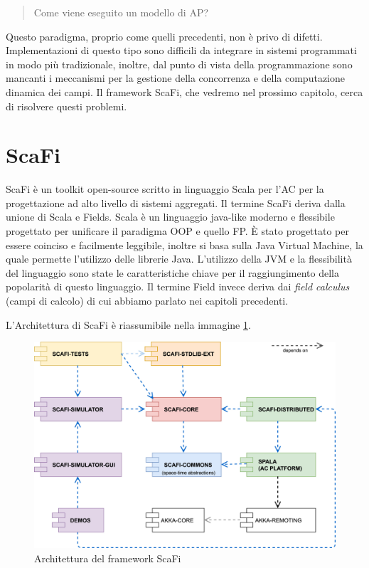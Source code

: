 \documentclass[12pt,a4paper,openright,twoside]{book}
\begin{document}
\begin{quote}
    \centering
    Come viene eseguito un modello di \ac{AP}?
\end{quote}

Questo paradigma, proprio come quelli precedenti, non è privo di difetti. 
Implementazioni di questo tipo sono difficili da integrare in sistemi programmati in modo più tradizionale, inoltre, dal punto di vista della programmazione sono mancanti i meccanismi per la gestione della concorrenza e della computazione dinamica dei campi. Il framework ScaFi, che vedremo nel prossimo capitolo, cerca di risolvere questi problemi.


\section{ScaFi}

ScaFi è un toolkit open-source scritto in linguaggio Scala per l'\ac{AC} per la progettazione ad alto livello di sistemi aggregati.
Il termine ScaFi deriva dalla unione di Scala e Fields. Scala è un linguaggio java-like moderno e flessibile progettato per unificare il paradigma \ac{OOP} e quello \ac{FP}. È stato progettato per essere coinciso e facilmente leggibile, inoltre si basa sulla Java Virtual Machine, la quale permette l'utilizzo delle librerie Java. L'utilizzo della JVM e la flessibilità del linguaggio sono state le caratteristiche chiave per il raggiungimento della popolarità di questo linguaggio. Il termine Field invece deriva dai \textit{field calculus} (campi di calcolo) di cui abbiamo parlato nei capitoli precedenti.

L'Architettura di ScaFi \cite{Casadei2022} è riassumibile nella immagine \cref{fig:scafi-arc}.

\begin{figure}
    \centering
    \includegraphics[width=.8\linewidth]{figures/scafi-arc.jpg}
    \caption{Architettura del framework ScaFi}
    \label{fig:scafi-arc}
\end{figure}
\end{document}
